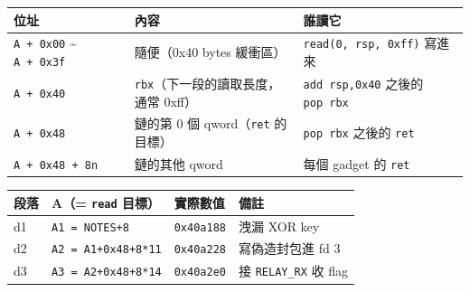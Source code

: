 \documentclass[10pt,a4paper]{article}
\newcounter{none}
\begin{document}
{\def\LTcaptype{none} %
\begin{longtable}[]{@{}
  >{\raggedright\arraybackslash}p{}
  >{\raggedright\arraybackslash}p{}
  >{\raggedright\arraybackslash}p{}@{}}
\toprule\noalign{}
\begin{minipage}[b]{\linewidth}\raggedright
位址
\end{minipage} & \begin{minipage}[b]{\linewidth}\raggedright
內容
\end{minipage} & \begin{minipage}[b]{\linewidth}\raggedright
誰讀它
\end{minipage} \\
\midrule\noalign{}
\endhead
\bottomrule\noalign{}
\endlastfoot
\texttt{A\ \allowbreak{}+\ \allowbreak{}0x00} \textasciitilde{} \texttt{A\ \allowbreak{}+\ \allowbreak{}0x3f} & 隨便（0x40
bytes 緩衝區） & \texttt{read(0,\allowbreak{}\ \allowbreak{}rsp,\allowbreak{}\ \allowbreak{}0xff)} 寫進來 \\
\texttt{A\ \allowbreak{}+\ \allowbreak{}0x40} & \texttt{rbx}（下一段的讀取長度，通常 0xff） &
\texttt{add\ \allowbreak{}rsp,\allowbreak{}0x40} 之後的 \texttt{pop\ \allowbreak{}rbx} \\
\texttt{A\ \allowbreak{}+\ \allowbreak{}0x48} & 鏈的第 0 個 qword（\texttt{ret} 的目標） &
\texttt{pop\ \allowbreak{}rbx} 之後的 \texttt{ret} \\
\texttt{A\ \allowbreak{}+\ \allowbreak{}0x48\ \allowbreak{}+\ \allowbreak{}8n} & 鏈的其他 qword & 每個 gadget 的
\texttt{ret} \\
\end{longtable}
}

{\def\LTcaptype{none} %
\begin{longtable}[]{@{}llll@{}}
\toprule\noalign{}
段落 & A（= \texttt{read} 目標） & 實際數值 & 備註 \\
\midrule\noalign{}
\endhead
\bottomrule\noalign{}
\endlastfoot
d1 & \texttt{A1\ \allowbreak{}=\ \allowbreak{}NOTES+8} & \texttt{0x40a188} & 洩漏 XOR key \\
d2 & \texttt{A2\ \allowbreak{}=\ \allowbreak{}A1+0x48+8*11} & \texttt{0x40a228} & 寫偽造封包進 fd
3 \\
d3 & \texttt{A3\ \allowbreak{}=\ \allowbreak{}A2+0x48+8*14} & \texttt{0x40a2e0} & 接
\texttt{RELAY\_\allowbreak{}RX} 收 flag \\
\end{longtable}
}
\end{document}
